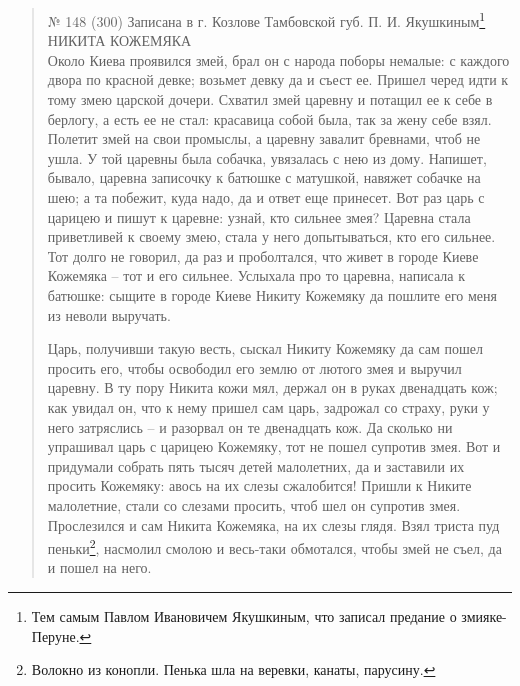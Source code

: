 \begin{quotation}
№ 148 (300) Записана в г. Козлове Тамбовской губ. П. И. Якушкиным\footnote{Тем самым Павлом Ивановичем Якушкиным, что записал предание о змияке-Перуне.}\\

НИКИТА КОЖЕМЯКА\\

Около Киева проявился змей, брал он с народа поборы немалые: с каждого двора по красной девке; возьмет девку да и съест ее. Пришел черед идти к тому змею царской дочери. Схватил змей царевну и потащил ее к себе в берлогу, а есть ее не стал: красавица собой была, так за жену себе взял. Полетит змей на свои промыслы, а царевну завалит бревнами, чтоб не ушла. У той царевны была собачка, увязалась с нею из дому. Напишет, бывало, царевна записочку к батюшке с матушкой, навяжет собачке на шею; а та побежит, куда надо, да и ответ еще принесет. Вот раз царь с царицею и пишут к царевне: узнай, кто сильнее змея? Царевна стала приветливей к своему змею, стала у него допытываться, кто его сильнее. Тот долго не говорил, да раз и проболтался, что живет в городе Киеве Кожемяка – тот и его сильнее. Услыхала про то царевна, написала к батюшке: сыщите в городе Киеве Никиту Кожемяку да пошлите его меня из неволи выручать.

Царь, получивши такую весть, сыскал Никиту Кожемяку да сам пошел просить его, чтобы освободил его землю от лютого змея и выручил царевну. В ту пору Никита кожи мял, держал он в руках двенадцать кож; как увидал он, что к нему пришел сам царь, задрожал со страху, руки у него затряслись – и разорвал он те двенадцать кож. Да сколько ни упрашивал царь с царицею Кожемяку, тот не пошел супротив змея. Вот и придумали собрать пять тысяч детей малолетних, да и заставили их просить Кожемяку: авось на их слезы сжалобится! Пришли к Никите малолетние, стали со слезами просить, чтоб шел он супротив змея. Прослезился и сам Никита Кожемяка, на их слезы глядя. Взял триста пуд пеньки\footnote{Волокно из конопли. Пенька шла на веревки, канаты, парусину.}, насмолил смолою и весь-таки обмотался, чтобы змей не съел, да и пошел на него.


\end{quotation}
